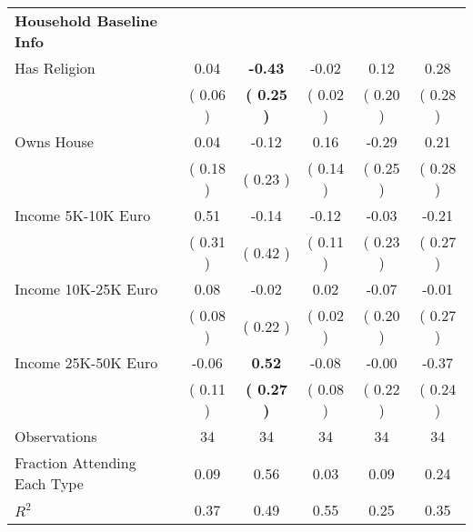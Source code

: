 \begin{table}[H]
{\begin{tabular}{lccccc}
\midrule
\textbf{Household Baseline Info} \\
\quad Has Religion &      0.04 & \textbf{    -0.43} &     -0.02 &      0.12 &      0.28 \\
\quad  & (     0.06 ) & \textbf{(     0.25 )}  & (     0.02 )  & (     0.20 ) & (     0.28 ) \\
\quad Owns House &      0.04 &     -0.12 &      0.16 &     -0.29 &      0.21 \\
\quad  & (     0.18 ) & (     0.23 )  & (     0.14 )  & (     0.25 ) & (     0.28 ) \\
\quad Income 5K-10K Euro &      0.51 &     -0.14 &     -0.12 &     -0.03 &     -0.21 \\
\quad  & (     0.31 ) & (     0.42 )  & (     0.11 )  & (     0.23 ) & (     0.27 ) \\
\quad Income 10K-25K Euro &      0.08 &     -0.02 &      0.02 &     -0.07 &     -0.01 \\
\quad  & (     0.08 ) & (     0.22 )  & (     0.02 )  & (     0.20 ) & (     0.27 ) \\
\quad Income 25K-50K Euro &     -0.06 & \textbf{     0.52} &     -0.08 &     -0.00 &     -0.37 \\
\quad  & (     0.11 ) & \textbf{(     0.27 )}  & (     0.08 )  & (     0.22 ) & (     0.24 ) \\
\midrule
Observations & 34 & 34 & 34 & 34 & 34 \\
Fraction Attending Each Type &      0.09 &      0.56 &      0.03 &      0.09 &      0.24 \\
\midrule
$ R^2$ &      0.37 &      0.49 &      0.55 &      0.25 &      0.35 \\
\bottomrule
\end{tabular}}
\end{table}
